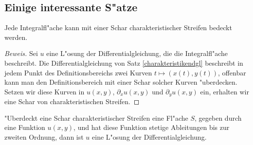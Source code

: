 \subsection{Einige interessante S"atze}

\begin{satz}Jede Integralfl"ache kann mit einer Schar
charakteristischer Streifen bedeckt werden.
\end{satz}

\begin{proof}[Beweis]
Sei $u$ eine L"osung der Differentialgleichung, die die Integralfl"ache beschreibt.
Die Differentialgleichung von Satz \ref{charakteristikendgl}
beschreibt in jedem Punkt des Definitionsbereichs zwei Kurven $t\mapsto(x(t),y(t))$,
offenbar kann man den Definitionsbereich mit einer Schar solcher Kurven
"uberdecken.
Setzen wir diese Kurven in $u(x,y)$, $\partial_xu(x,y)$
und $\partial_yu(x,y)$ ein, erhalten wir eine Schar von charakteristischen
Streifen.
\end{proof}

\begin{satz}"Uberdeckt eine Schar charakteristischer Streifen
eine Fl"ache $S$, gegeben durch eine Funktion $u(x,y)$, und hat
diese Funktion stetige Ableitungen bis zur zweiten Ordnung,
dann ist $u$ eine L"osung der Differentialgleichung.
\end{satz}

